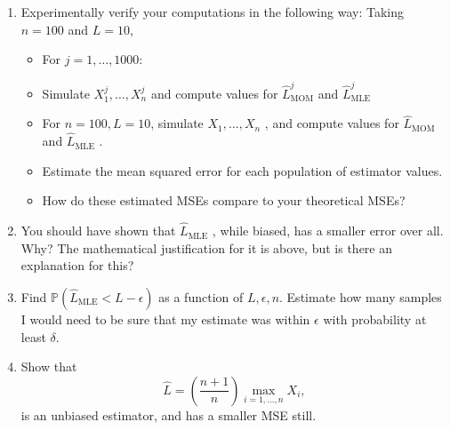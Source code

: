 \documentclass[letter, 12pt]{article}
\begin{document}
\begin{enumerate}[wide = 0pt, label = \arabic*)]
		\item {Experimentally verify your computations in the following way: Taking $ n = 100 $ and $ L = 10 $,}
		\begin{itemize}
			\item {For $ j = 1, \dots , 1000 $:}
			\item {Simulate $ X_1^j , \dots , X_n^j $ and compute values for $ \hat{L}_{\text{MOM}}^j $ and $ \hat{L}_{\text{MLE}}^j $}
			\item {For $ n = 100, L = 10 $, simulate $ X_1 , \dots , X_n $ , and compute values for $ \hat{L}_{\text{MOM}} $ and $ \hat{L}_{\text{MLE}} $ .}
			\item {Estimate the mean squared error for each population of estimator values.}
			\item {How do these estimated MSEs compare to your theoretical MSEs?}
		\end{itemize}
	
		\item {You should have shown that $ \hat{L}_{\text{MLE}} $ , while biased, has a smaller error over all. Why? The mathematical justification for it is above, but is there an explanation for this?}
		
		\item {Find $ \mathbb{P}(\hat{L}_{\text{MLE}} < L - \epsilon) $ as a function of $ L, \epsilon, n $. Estimate how many samples I would need to be sure that my estimate was within $ \epsilon $ with probability at least $ \delta $.}
		
		\item {Show that
		\begin{equation}
			\hat{L} = (\frac{n+1}{n})\max_{i=1,\dots,n}X_i,
		\end{equation}
		is an unbiased estimator, and has a smaller MSE still.
		}
	\end{enumerate}
\end{document}
